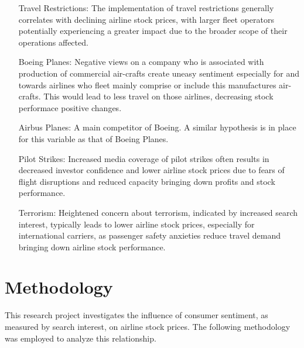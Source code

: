 \documentclass[12pt]{report}
\begin{document}
\begin{enumerate}
    \item[Travel Restrictions:] The implementation of travel restrictions generally correlates with declining airline stock prices, with larger fleet operators potentially experiencing a greater impact due to the broader scope of their operations affected.
    \item[Boeing Planes:] Negative views on a company who is associated with production of commercial air-crafts create uneasy sentiment especially for and towards airlines who fleet mainly comprise or include this manufactures air-crafts. This would lead to less travel on those airlines, decreasing stock performace positive changes.
    \item[Airbus Planes:] A main competitor of Boeing. A similar hypothesis is in place for this variable as that of Boeing Planes.
    \item[Pilot Strikes:] Increased media coverage of pilot strikes often results in decreased investor confidence and lower airline stock prices due to fears of flight disruptions and reduced capacity bringing down profits and stock performance.
    \item[Terrorism:] Heightened concern about terrorism, indicated by increased search interest, typically leads to lower airline stock prices, especially for international carriers, as passenger safety anxieties reduce travel demand bringing down airline stock performance.


\end{enumerate}
\nocite{*}
\chapter*{Methodology}



This research project investigates the influence of consumer
sentiment, as measured by search interest, on airline stock prices. The
following methodology was employed to analyze this relationship.
\end{document}
